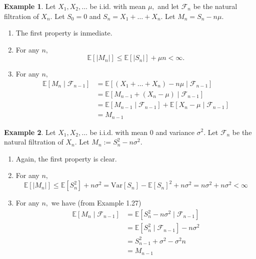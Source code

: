 \documentclass[10pt, oneside]{article}
\newcommand{\bbE}{\mathbb{E}}
\newcommand{\Var}{\text{Var}}
\theoremstyle{definition}
\newtheorem{exmp}{Example}[section]
\begin{document}
\begin{exmp}
    Let $X_1, X_2, \dots$ be i.id. with mean $\mu,$ and let $\mathcal{F}_n$ be the natural filtration of $X_n.$ Let $S_0 = 0$ and $S_n = X_1 + \dots + X_n.$ Let $M_n = S_n - n\mu.$ 

    \begin{enumerate}
        \item The first property is inmediate.
        \item For any $n,$
        \[\bbE[|M_n|] \leq \bbE[|S_n|] + \mu n < \infty.\]
        \item For any $n,$
    \begin{align*}
        \bbE[M_n \mid \mathcal{F}_{n-1}] &= \bbE[(X_1 + \dots + X_n) - n\mu \mid \mathcal{F}_{n-1}]\\&= \bbE[M_{n-1} + (X_n - \mu) \mid \mathcal{F}_{n-1}]\\& = \bbE[M_{n-1} \mid \mathcal{F}_{n-1}] + \bbE[X_n - \mu \mid \mathcal{F}_{n-1}]\\& = M_{n-1}
    \end{align*}
    \end{enumerate}
\end{exmp}

\begin{exmp}
    Let $X_1, X_2, \dots$ be i.i.d. with mean $0$ and variance $\sigma^2.$ Let $\mathcal{F}_n$ be the natural filtration of $X_n.$ Let $M_n:= S_n^2 - n\sigma^2.$
    \begin{enumerate}
        \item Again, the first property is clear.
        \item For any $n,$
\[\bbE[|M_n|] \leq \bbE[S_n^2] + n\sigma^2 = \Var[S_n] - \bbE[S_n]^2 + n\sigma^2 = n\sigma^2 + n\sigma^2 < \infty\]
\item For any $n,$ we have (from Example 1.27)
\begin{align*}
    \bbE[M_n \mid \mathcal{F}_{n-1}] &= \bbE[S_n^2 - n\sigma^2 \mid \mathcal{F}_{n-1}]\\
    &= \bbE[S_n^2\mid \mathcal{F}_{n-1}] - n\sigma^2\\
    &= S_{n-1}^2 + \sigma^2 - \sigma^2 n\\
    &= M_{n-1}
\end{align*}
    \end{enumerate}
\end{exmp}
\end{document}
